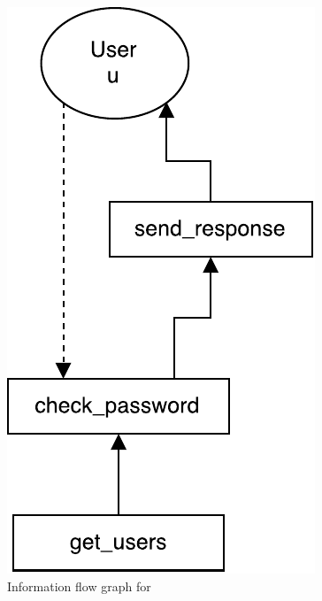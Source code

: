 \begin{figure}
  \centering
  \includegraphics[scale=0.8]{figures/dlm_check_password}
  \caption{Information flow graph for }
  \label{example:graph:check_password}
\end{figure}
